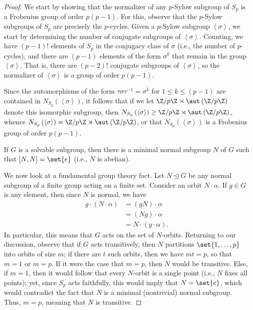 \documentclass[10pt]{mypackage}
\begin{document}
\begin{proof}
  We start by showing that the normalizer of any $p$-Sylow subgroup of $S_p$ is a Frobenius group of order $p\left( p-1 \right)$. For this, observe that the $p$-Sylow subgroups of $S_p$ are precisely the $p$-cycles. Given a $p$-Sylow subgroup $ \left\langle \sigma \right\rangle $, we start by determining the number of conjugate subgroups of $\left\langle \sigma \right\rangle$. Counting, we have $\left( p-1 \right)!$ elements of $S_p$ in the conjugacy class of $\sigma$ (i.e., the number of $p$-cycles), and there are $\left( p-1 \right)$ elements of the form $ \sigma^{k} $ that remain in the group $ \left\langle \sigma \right\rangle $. That is, there are $\left( p-2 \right)!$ conjugate subgroups of $ \left\langle \sigma \right\rangle $, so the normalizer of $ \left\langle \sigma \right\rangle $ is a group of order $p\left( p-1 \right)$.

  Since the automorphisms of the form $\tau\sigma\tau^{-1} = \sigma^{k}$ for $1\leq k \leq \left( p-1 \right)$ are contained in $N_{S_p}\left( \left\langle \sigma \right\rangle \right)$, it follows that if we let $\Z/p\Z\rtimes \aut\left( \Z/p\Z \right)$ denote this isomorphic subgroup, then $N_{S_p}\left( \left\langle \sigma \right\rangle \right)\geq \Z/p\Z\rtimes \aut\left( \Z/p\Z \right)$, whence $N_{S_p}\left( \left\langle \sigma \right\rangle \right) = \Z/p\Z\rtimes\aut\left( \Z/p\Z \right)$, or that $N_{S_p}\left( \left\langle \sigma \right\rangle \right)$ is a Frobenius group of order $p\left( p-1 \right)$.

  If $G$ is a solvable subgroup, then there is a minimal normal subgroup $N$ of $G$ such that $\left[ N,N \right] = \set{e}$ (i.e., $N$ is abelian).

  We now look at a fundamental group theory fact. Let $N\trianglelefteq G$ be any normal subgroup of a finite group acting on a finite set. Consider an orbit $N\cdot \alpha$. If $g\in G$ is any element, then since $N$ is normal, we have
  \begin{align*}
    g\cdot \left( N\cdot \alpha \right) &= \left( gN \right)\cdot \alpha\\
                                        &= \left( Ng \right)\cdot \alpha\\
                                        &= N\cdot \left( g\cdot \alpha \right).
  \end{align*}
  In particular, this means that $G$ acts on the set of $N$-orbits. Returning to our discussion, observe that if $G$ acts transitively, then $N$ partitions $\set{1,\dots,p}$ into orbits of size $m$; if there are $t$ such orbits, then we have $mt = p$, so that $m = 1$ or $m = p$. If it were the case that $m = p$, then $N$ would be transitive. Else, if $m = 1$, then it would follow that every $N$-orbit is a single point (i.e., $N$ fixes all points); yet, since $S_p$ acts faithfully, this would imply that $N = \set{e}$, which would contradict the fact that $N$ is a minimal (nontrivial) normal subgroup. Thus, $m = p$, meaning that $N$ is transitive.


\end{proof}
\end{document}
